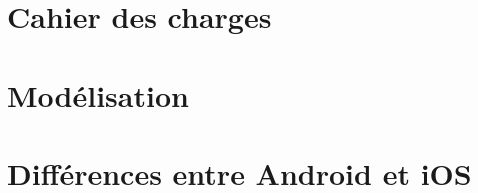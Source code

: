 \section{Cahier des charges}
	
	
\section{Modélisation}
	
						
\section{Différences entre Android et iOS}
	